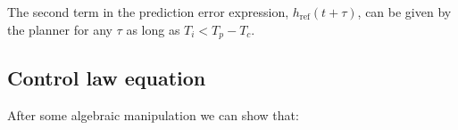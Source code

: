 \documentclass[letterpaper, 10 pt, conference]{ieeeconf}  %
\begin{document}

The second term in the prediction error expression, ${h_{\text{ref}}(t+\tau)}$, 
can be given by the planner for any $\tau$ as long as ${T_i < T_p - T_c}$.



\subsection{Control law equation}

After some algebraic manipulation we can show that:
\end{document}
